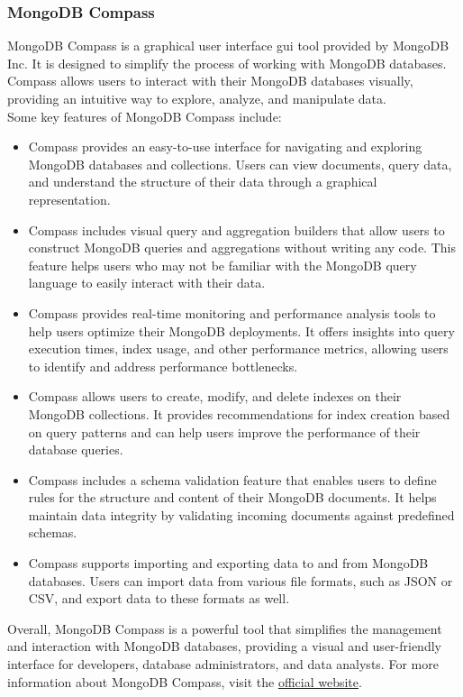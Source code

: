 \subsubsection{MongoDB Compass}
MongoDB Compass is a graphical user interface \gls{gui} tool provided by MongoDB Inc. It is designed to simplify the process of working with MongoDB databases. Compass allows users to interact with their MongoDB databases visually, providing an intuitive way to explore, analyze, and manipulate data.\vspace{5mm} \\
Some key features of MongoDB Compass include:
\begin{itemize}
  \item Compass provides an easy-to-use interface for navigating and exploring MongoDB databases and collections. Users can view documents, query data, and understand the structure of their data through a graphical representation.
  \item Compass includes visual query and aggregation builders that allow users to construct MongoDB queries and aggregations without writing any code. This feature helps users who may not be familiar with the MongoDB query language to easily interact with their data.
  \item Compass provides real-time monitoring and performance analysis tools to help users optimize their MongoDB deployments. It offers insights into query execution times, index usage, and other performance metrics, allowing users to identify and address performance bottlenecks.
  \item Compass allows users to create, modify, and delete indexes on their MongoDB collections. It provides recommendations for index creation based on query patterns and can help users improve the performance of their database queries.
  \item Compass includes a schema validation feature that enables users to define rules for the structure and content of their MongoDB documents. It helps maintain data integrity by validating incoming documents against predefined schemas.
  \item Compass supports importing and exporting data to and from MongoDB databases. Users can import data from various file formats, such as JSON or CSV, and export data to these formats as well.
\end{itemize}
Overall, MongoDB Compass is a powerful tool that simplifies the management and interaction with MongoDB databases, providing a visual and user-friendly interface for developers, database administrators, and data analysts.
For more information about MongoDB Compass, visit the \href{https://www.mongodb.com/products/compass}{official website}.
